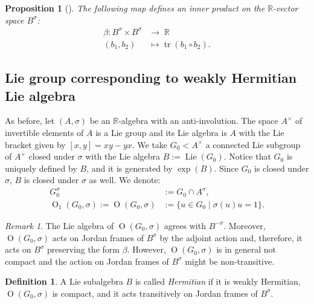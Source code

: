 \documentclass[a4paper,oneside,11pt]{amsart}
\DeclareMathOperator{\OO}{O}
\DeclareMathOperator{\Lie}{Lie}
\DeclareMathOperator{\tr}{tr}
\newcommand{\R}{\mathbb R}
\theoremstyle{plain}
\newtheorem{prop}[teo]{Proposition}
\theoremstyle{definition}
\newtheorem{df}[teo]{Definition}
\theoremstyle{remark}
\newtheorem{rem}[teo]{Remark}
\newcommand{\defin}{\emph}
\begin{document}
\begin{prop}[{\cite[Proposition~III.1.5]{Faraut}}]\label{inner_prod_B}
The following map defines an inner product on the $\R$-vector space $B^{\sigma}$:
\begin{align*}
\beta\colon  B^{\sigma}\times B^{\sigma} & \to \; \R\\
 (b_1,b_2)\; & \mapsto  \tr(b_1\circ b_2).
\end{align*}
\end{prop}











\subsection{Lie group corresponding to weakly Hermitian Lie algebra}\label{Herm_Lie}

As before, let $(A,\sigma)$ be an $\R$-algebra with an anti-involution. The space $A^\times$ of invertible elements of $A$ is a Lie group and its Lie algebra is $A$ with the Lie bracket given by $[x,y]=xy-yx$. We take $G_0<A^\times$ a connected Lie subgroup of $A^\times$ closed under $\sigma$ with the Lie algebra $B:=\Lie(G_0)$. Notice that $G_0$ is uniquely defined by $B$, and it is generated by $\exp(B)$. Since $G_0$ is closed under $\sigma$, $B$ is closed under $\sigma$ as well. We denote: 
\begin{align*}
    G^{\sigma}_0& :=G_0\cap A^{\sigma},\\
    \OO_1(G_0,\sigma):=\OO(G_0,\sigma)& :=\{u\in G_0\mid \sigma(u)u=1\}.    
\end{align*}

\begin{rem}
The Lie algebra of $\OO(G_0,\sigma)$ agrees with $B^{-\sigma}$. Moreover, $\OO(G_0,\sigma)$ acts on Jordan frames of $B^\sigma$ by the adjoint action and, therefore, it acts on $B^\sigma$ preserving the form $\beta$. However, $\OO(G_0,\sigma)$ is in general not compact and the action on Jordan frames of $B^\sigma$ might be non-transitive.
\end{rem}

\begin{df}
    A Lie subalgebra $B$ is called \defin{Hermitian} if it is weakly Hermitian, $\OO(G_0,\sigma)$ is compact, and it acts transitively on Jordan frames of $B^\sigma$.
\end{df}
\end{document}
